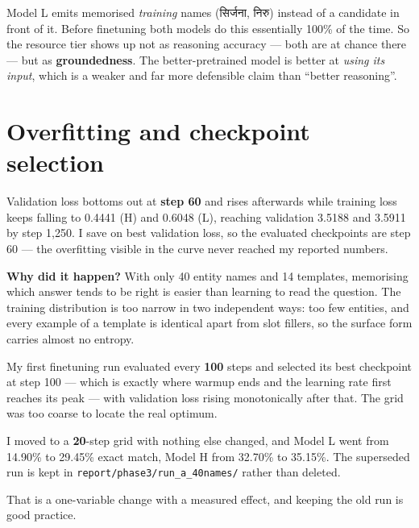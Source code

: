 \documentclass[11pt]{report}
\newcommand{\dn}[1]{{\devanagarifont #1}}
\begin{document}
\begin{keypoint}
Model L emits memorised \emph{training} names (\dn{सिर्जना}, \dn{निरु}) instead
of a candidate in front of it. Before finetuning both models do this
essentially 100\% of the time. So the resource tier shows up not as reasoning
accuracy --- both are at chance there --- but as \textbf{groundedness}. The
better-pretrained model is better at \emph{using its input}, which is a weaker
and far more defensible claim than ``better reasoning''.
\end{keypoint}

\section{Overfitting and checkpoint selection}

\begin{shortans}
Validation loss bottoms out at \textbf{step 60} and rises afterwards while
training loss keeps falling to 0.4441 (H) and 0.6048 (L), reaching validation
3.5188 and 3.5911 by step 1,250. I save on best validation loss, so the
evaluated checkpoints are step 60 --- the overfitting visible in the curve never
reached my reported numbers.
\end{shortans}

\begin{deeper}
\textbf{Why did it happen?} With only 40 entity names and 14 templates,
memorising which answer tends to be right is easier than learning to read the
question. The training distribution is too narrow in two independent ways: too
few entities, and every example of a template is identical apart from slot
fillers, so the surface form carries almost no entropy.
\end{deeper}

\begin{trap}
My first finetuning run evaluated every \textbf{100} steps and selected its best
checkpoint at step 100 --- which is exactly where warmup ends and the learning
rate first reaches its peak --- with validation loss rising monotonically after
that. The grid was too coarse to locate the real optimum.

\smallskip
I moved to a \textbf{20}-step grid with nothing else changed, and Model L went
from 14.90\% to 29.45\% exact match, Model H from 32.70\% to 35.15\%. The
superseded run is kept in \texttt{report/phase3/run\_a\_40names/} rather than
deleted.

\smallskip
That is a one-variable change with a measured effect, and keeping the old run
is good practice.
\end{trap}
\end{document}
